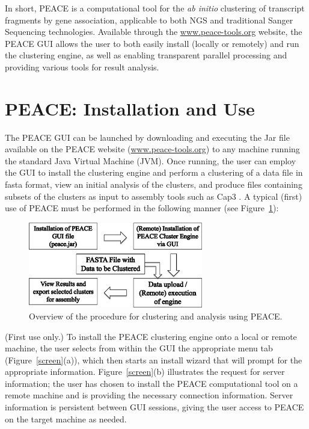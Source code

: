 \documentclass[a4,center,fleqn]{NAR}
\newcommand{\peace} {{\small PEACE}}
\newcommand{\capthree} {{\small Cap3}}
\begin{document}
In short, \peace\/ is a computational tool for the {\it ab initio}
clustering of transcript fragments by gene association, applicable to
both NGS and traditional Sanger Sequencing technologies.  Available
through the \href{http://www.peace-tools.org}{www.peace-tools.org}
website, the \peace\/ GUI allows the user to both easily install
(locally or remotely) and run the clustering engine, as well as
enabling transparent parallel processing and providing various tools
for result analysis.

\section{\peace\/: Installation and Use}

The \peace\/ GUI can be launched by downloading and executing the
Jar file available on the \peace\/ website
(\href{http://www.peace-tools.org}{www.peace-tools.org}) to any
machine running the standard Java Virtual Machine (JVM).  Once
running, the user can employ the GUI to install the clustering engine
and perform a clustering of a data file in {\sc fasta} format, view an
initial analysis of the clusters, and produce files containing subsets
of the clusters as input to assembly tools such as \capthree\/ 
\cite{Huang99}.  A typical (first) use of \peace\/ must be
performed in the following manner (see Figure~\ref{fig:workflow}):

\begin{figure}
  \centerline{\includegraphics[width=3in]{pics.d/workflow.eps}}
  \caption{Overview of the procedure for clustering and analysis using
    PEACE.}\label{fig:workflow}
\end{figure}


 (First use only.) To install the
\peace\/ clustering engine onto a local or remote machine, the user selects
from within the GUI the appropriate menu tab (Figure~\ref{screen}(a)),
which then starts an install wizard that will prompt for the
appropriate information.  Figure~\ref{screen}(b) illustrates the
request for server information; the user has chosen to install the
\peace\/ computational tool on a remote machine and is providing
the necessary connection information.  Server information is
persistent between GUI sessions, giving the user access to \peace\/
on the target machine as needed.
\end{document}
